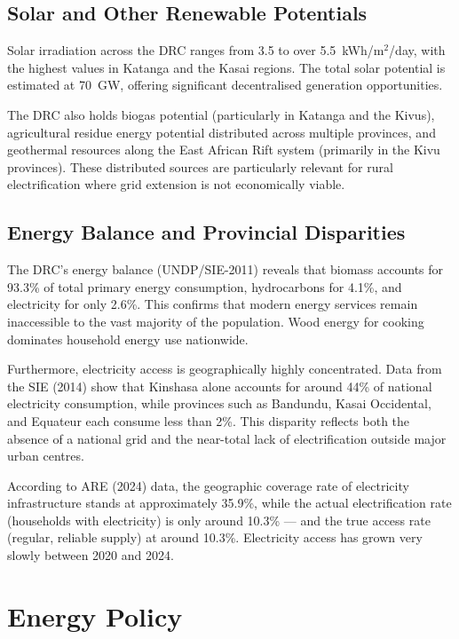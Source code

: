 \subsection{Solar and Other Renewable Potentials}

Solar irradiation across the DRC ranges from 3.5 to over 5.5~kWh/m$^2$/day, with the highest values in Katanga and the Kasai regions. The total solar potential is estimated at 70~GW, offering significant decentralised generation opportunities.

The DRC also holds biogas potential (particularly in Katanga and the Kivus), agricultural residue energy potential distributed across multiple provinces, and geothermal resources along the East African Rift system (primarily in the Kivu provinces). These distributed sources are particularly relevant for rural electrification where grid extension is not economically viable.

\subsection{Energy Balance and Provincial Disparities}

The DRC's energy balance (UNDP/SIE-2011) reveals that biomass accounts for 93.3\% of total primary energy consumption, hydrocarbons for 4.1\%, and electricity for only 2.6\%. This confirms that modern energy services remain inaccessible to the vast majority of the population. Wood energy for cooking dominates household energy use nationwide.

Furthermore, electricity access is geographically highly concentrated. Data from the SIE (2014) show that Kinshasa alone accounts for around 44\% of national electricity consumption, while provinces such as Bandundu, Kasai Occidental, and Equateur each consume less than 2\%. This disparity reflects both the absence of a national grid and the near-total lack of electrification outside major urban centres.

According to ARE (2024) data, the geographic coverage rate of electricity infrastructure stands at approximately 35.9\%, while the actual electrification rate (households with electricity) is only around 10.3\% — and the true access rate (regular, reliable supply) at around 10.3\%. Electricity access has grown very slowly between 2020 and 2024.

\section{Energy Policy}

